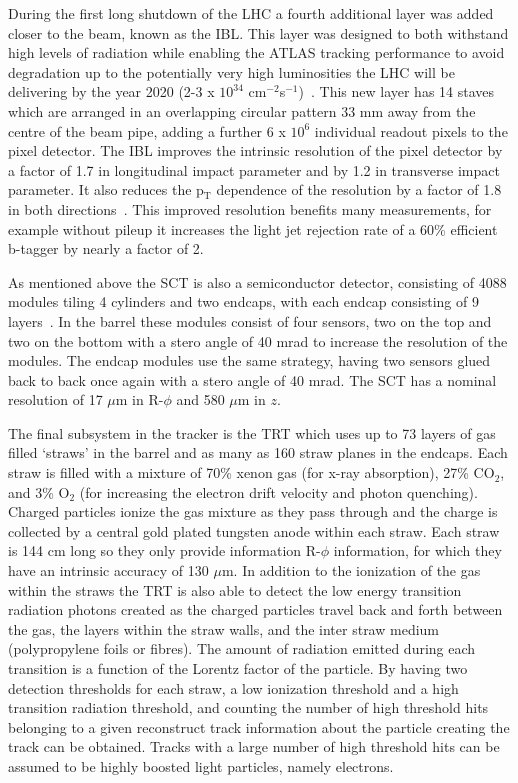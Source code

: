 During the first long shutdown of the LHC a fourth additional layer was added closer to the beam, known as the \gls{IBL}.  
This layer was designed to both withstand high levels of radiation while enabling the ATLAS tracking performance to avoid degradation up to the potentially very high luminosities the LHC will be delivering by the year 2020 (2-3 x $10^{34}$ cm$^{-2}$s$^{-1}$)~\cite{IBL1}.  
This new layer has 14 staves which are arranged in an overlapping circular pattern 33 mm away from the centre of the beam pipe, adding a further 6 x $10^{6}$ individual readout pixels to the pixel detector.  
The IBL improves the intrinsic resolution of the pixel detector by a factor of 1.7 in longitudinal impact parameter and by 1.2 in transverse impact parameter.  
It also reduces the p$_{\mathrm{T}}$ dependence of the resolution by a factor of 1.8 in both directions~\cite{IBL2}.  
This improved resolution benefits many measurements, for example without pileup it increases the light jet rejection rate of a 60\% efficient b-tagger by nearly a factor of 2.  

As mentioned above the \gls{SCT} is also a semiconductor detector, consisting of 4088 modules tiling 4 cylinders and two endcaps, with each endcap consisting of 9 layers~\cite{JOIATLAS}.  
In the barrel these modules consist of four sensors, two on the top and two on the bottom with a stero angle of 40 mrad to increase the resolution of the modules.  
The endcap modules use the same strategy, having two sensors glued back to back once again with a stero angle of 40 mrad.  
The SCT has a nominal resolution of 17 $\mu$m in R-$\phi$ and 580 $\mu$m in $z$.  

The final subsystem in the tracker is the TRT which uses up to 73 layers of gas filled `straws' in the barrel and as many as 160 straw planes in the endcaps.  
Each straw is filled with a mixture of 70\% xenon gas (for x-ray absorption), 27\% CO$_{2}$, and 3\% O$_{2}$ (for increasing the electron drift velocity and photon quenching).  
Charged particles ionize the gas mixture as they pass through and the charge is collected by a central gold plated tungsten anode within each straw.  
Each straw is 144 cm long so they only provide information R-$\phi$ information, for which they have an intrinsic accuracy of 130 $\mu$m.  
In addition to the ionization of the gas within the straws the TRT is also able to detect the low energy transition radiation photons created as the charged particles travel back and forth between the gas, the layers within the straw walls, and the inter straw medium (polypropylene foils or fibres).  
The amount of radiation emitted during each transition is a function of the Lorentz factor of the particle.  
By having two detection thresholds for each straw, a low ionization threshold and a high transition radiation threshold, and counting the number of high threshold hits belonging to a given reconstruct track information about the particle creating the track can be obtained.  
Tracks with a large number of high threshold hits can be assumed to be highly boosted light particles, namely electrons.  




